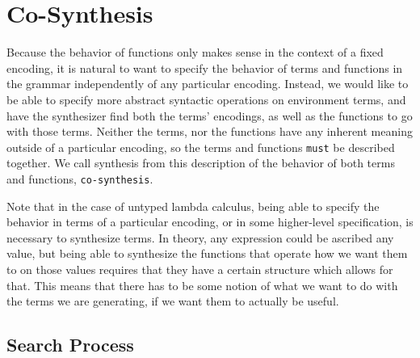 \section{Co-Synthesis} \label{sec:co-synthesis}
Because the behavior of functions only makes sense in the context of a
  fixed encoding, it is natural to want to specify the behavior of
  terms and functions in the grammar independently of any particular
  encoding.
Instead, we would like to be able to specify more abstract syntactic
  operations on environment terms, and have the synthesizer find both
  the terms' encodings, as well as the functions to go with those terms.
Neither the terms, nor the functions have any inherent meaning outside
  of a particular encoding, so the terms and functions \texttt{must} be
  described together.
We call synthesis from this description of the behavior of both terms
  and functions, \texttt{co-synthesis}.

Note that in the case of untyped lambda calculus, being able to specify
  the behavior in terms of a particular encoding, or in some higher-level
  specification, is necessary to synthesize terms.
In theory, any expression could be ascribed any value, but being able to
  synthesize the functions that operate how we want them to on those values
  requires that they have a certain structure which allows for that.
This means that there has to be some notion of what we want to do with
  the terms we are generating, if we want them to actually be useful.

\subsection{Search Process}
